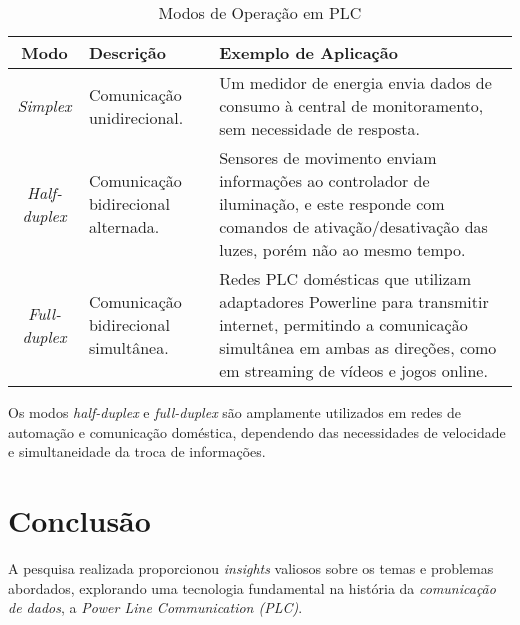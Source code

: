 \documentclass[12pt]{article}
\begin{document}
\begin{table}[h!]
\centering
\caption{Modos de Operação em PLC}
\label{tab:modos-comunicacao}
\begin{tabular}{|c|p{4cm}|p{8cm}|}
\hline
\textbf{Modo}     & \textbf{Descrição}                                                                                         & \textbf{Exemplo de Aplicação}                                                                                                                                                                                                 \\ \hline
\textit{Simplex}  & Comunicação unidirecional.                                                                                 & Um medidor de energia envia dados de consumo à central de monitoramento, sem necessidade de resposta.                                                                                                                           \\ \hline
\textit{Half-duplex} & Comunicação bidirecional alternada.                                                                      & Sensores de movimento enviam informações ao controlador de iluminação, e este responde com comandos de ativação/desativação das luzes, porém não ao mesmo tempo.                                                               \\ \hline
\textit{Full-duplex} & Comunicação bidirecional simultânea.                                                                     & Redes PLC domésticas que utilizam adaptadores Powerline para transmitir internet, permitindo a comunicação simultânea em ambas as direções, como em streaming de vídeos e jogos online.                                          \\ \hline
\end{tabular}
\end{table}

\noindent Os modos \textit{half-duplex} e \textit{full-duplex} são amplamente utilizados em redes de automação e comunicação doméstica, dependendo das necessidades de velocidade e simultaneidade da troca de informações.

\section{Conclusão}

A pesquisa realizada proporcionou \textit{insights} valiosos sobre os temas e problemas abordados, explorando uma tecnologia fundamental na história da \textit{comunicação de dados}, a \textit{Power Line Communication (PLC)}.
\end{document}
